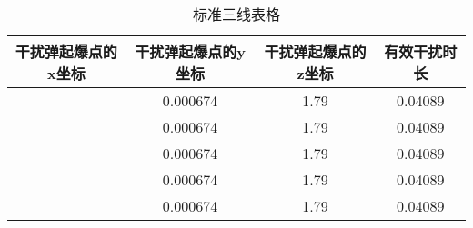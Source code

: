 \documentclass[../main.tex]{subfiles}
\begin{document}
\begin{table}[H]
\caption{标准三线表格}
\label{tab:031} 
\centering
\begin{small}
\begin{tabular}{cccc}
\toprule[1.5pt]
干扰弹起爆点的x坐标&干扰弹起爆点的y坐标&干扰弹起爆点的z坐标&有效干扰时长\\
\midrule[1pt]
                 & 0.000674     & 1.79                    & 0.04089  \\               
                 & 0.000674     & 1.79                    & 0.04089  \\               
                 & 0.000674     & 1.79                    & 0.04089  \\                
                 & 0.000674     & 1.79                    & 0.04089  \\                
                 & 0.000674     & 1.79                    & 0.04089  \\               
\bottomrule[1.5pt]
\end{tabular}
\end{small}
\end{table}

\end{document}
